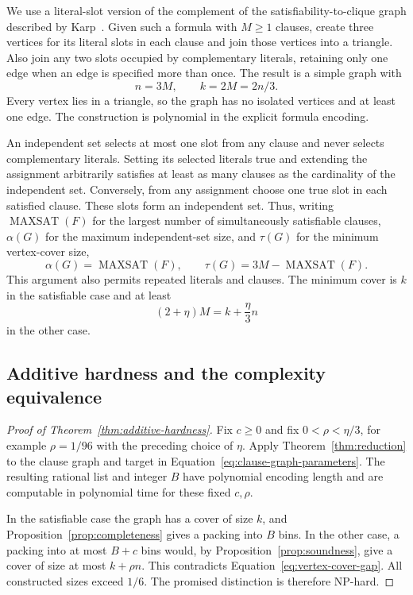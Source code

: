 We use a literal-slot version of the complement of the
satisfiability-to-clique graph described by Karp~\cite[p.~97]{Karp1972}.
Given such a formula with $M\ge1$ clauses, create three vertices for its
literal slots in each clause and join those vertices into a triangle.
Also join any two slots occupied by complementary literals, retaining
only one edge when an edge is specified more than once.  The result is
a simple graph with
\begin{equation}\label{eq:clause-graph-parameters}
  n=3M,\qquad k=2M=2n/3.
\end{equation}
Every vertex lies in a triangle, so the graph has no isolated vertices
and at least one edge.  The construction is polynomial in the explicit
formula encoding.

An independent set selects at most one slot from any clause and never
selects complementary literals.  Setting its selected literals true and
extending the assignment arbitrarily satisfies at least as many clauses
as the cardinality of the independent set.  Conversely, from any assignment
choose one true slot in each satisfied clause.  These slots form an
independent set.  Thus, writing $\operatorname{MAXSAT}(F)$ for the largest
number of simultaneously satisfiable clauses, $\alpha(G)$ for the
maximum independent-set size, and $\tau(G)$ for the minimum vertex-cover
size,
\begin{equation}\label{eq:clause-graph-identity}
  \alpha(G)=\operatorname{MAXSAT}(F),
  \qquad \tau(G)=3M-\operatorname{MAXSAT}(F).
\end{equation}
This argument also permits repeated literals and clauses.
The minimum cover is $k$ in the satisfiable case and at least
\begin{equation}\label{eq:vertex-cover-gap}
  (2+\eta)M=k+\frac{\eta}{3}n
\end{equation}
in the other case.

\subsection{Additive hardness and the complexity equivalence}

\begin{proof}[Proof of Theorem~\ref{thm:additive-hardness}]
Fix $c\ge0$ and fix $0<\rho<\eta/3$, for example $\rho=1/96$ with
the preceding choice of $\eta$.  Apply Theorem~\ref{thm:reduction} to
the clause graph and target in Equation~\eqref{eq:clause-graph-parameters}.
The resulting rational list and integer $B$ have polynomial encoding
length and are computable in polynomial time for these fixed $c,\rho$.

In the satisfiable case the graph has a cover of size $k$, and
Proposition~\ref{prop:completeness} gives a packing into $B$ bins.
In the other case, a packing into at most $B+c$ bins would, by
Proposition~\ref{prop:soundness}, give a cover of size at most
$k+\rho n$.  This contradicts Equation~\eqref{eq:vertex-cover-gap}.
All constructed sizes exceed $1/6$.  The promised distinction is
therefore NP-hard.
\end{proof}

